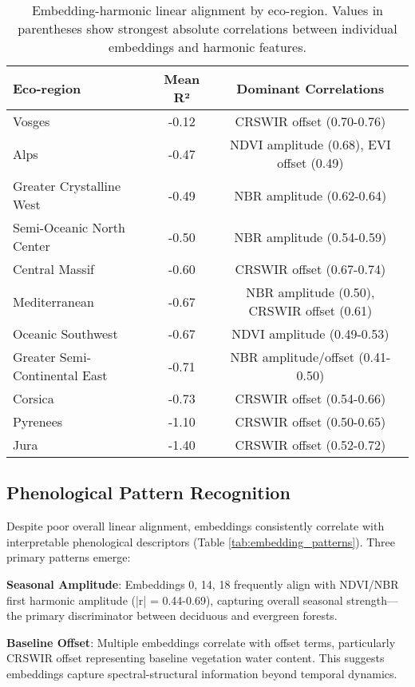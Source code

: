 \documentclass[utf8]{FrontiersinHarvard}
\begin{document}
\begin{table}[H]
\centering
\begin{tabular}{lcc}
\hline
\textbf{Eco-region} & \textbf{Mean R²} & \textbf{Dominant Correlations} \\ \hline
Vosges & -0.12 & CRSWIR offset (0.70-0.76) \\
Alps & -0.47 & NDVI amplitude (0.68), EVI offset (0.49) \\
Greater Crystalline West & -0.49 & NBR amplitude (0.62-0.64) \\
Semi-Oceanic North Center & -0.50 & NBR amplitude (0.54-0.59) \\
Central Massif & -0.60 & CRSWIR offset (0.67-0.74) \\
Mediterranean & -0.67 & NBR amplitude (0.50), CRSWIR offset (0.61) \\
Oceanic Southwest & -0.67 & NDVI amplitude (0.49-0.53) \\
Greater Semi-Continental East & -0.71 & NBR amplitude/offset (0.41-0.50) \\
Corsica & -0.73 & CRSWIR offset (0.54-0.66) \\
Pyrenees & -1.10 & CRSWIR offset (0.50-0.65) \\
Jura & -1.40 & CRSWIR offset (0.52-0.72) \\ \hline
\end{tabular}
\caption{Embedding-harmonic linear alignment by eco-region. Values in parentheses show strongest absolute correlations between individual embeddings and harmonic features.}
\label{tab:similarity_ecoregion}
\end{table}

\subsection{Phenological Pattern Recognition}

Despite poor overall linear alignment, embeddings consistently correlate with interpretable phenological descriptors (Table \ref{tab:embedding_patterns}). Three primary patterns emerge:

\textbf{Seasonal Amplitude}: Embeddings 0, 14, 18 frequently align with NDVI/NBR first harmonic amplitude (|r| = 0.44-0.69), capturing overall seasonal strength—the primary discriminator between deciduous and evergreen forests.

\textbf{Baseline Offset}: Multiple embeddings correlate with offset terms, particularly CRSWIR offset representing baseline vegetation water content. This suggests embeddings capture spectral-structural information beyond temporal dynamics.
\end{document}
